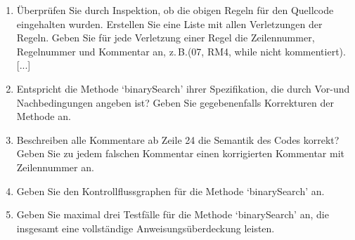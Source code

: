 \documentclass{lehramt-informatik}
\begin{document}
\begin{enumerate}
\item Überprüfen Sie durch Inspektion, ob die obigen Regeln für den
Quellcode eingehalten wurden. Erstellen Sie eine Liste mit allen
Verletzungen der Regeln. Geben Sie für jede Verletzung einer Regel die
Zeilennummer, Regelnummer und Kommentar an, z.\,B.(07, RM4, while nicht
kommentiert).[...]

\item Entspricht die Methode ‘binarySearch’ ihrer Spezifikation, die
durch Vor-und Nachbedingungen angeben ist? Geben Sie gegebenenfalls
Korrekturen der Methode an.

\item Beschreiben alle Kommentare ab Zeile 24 die Semantik des Codes
korrekt? Geben Sie zu jedem falschen Kommentar einen korrigierten
Kommentar mit Zeilennummer an.

\item Geben Sie den Kontrollflussgraphen für die Methode ‘binarySearch’
an.

\item Geben Sie maximal drei Testfälle für die Methode ‘binarySearch’
an, die insgesamt eine vollständige Anweisungsüberdeckung leisten.


\end{enumerate}

\literatur
\end{document}
